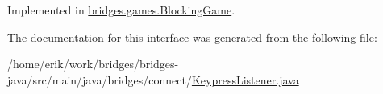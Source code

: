 Implemented in \hyperlink{classbridges_1_1games_1_1_blocking_game_a53b1b38826785ee7c7a13f486b7b72ba}{bridges.\+games.\+Blocking\+Game}.



The documentation for this interface was generated from the following file\+:\begin{DoxyCompactItemize}
\item 
/home/erik/work/bridges/bridges-\/java/src/main/java/bridges/connect/\hyperlink{_keypress_listener_8java}{Keypress\+Listener.\+java}\end{DoxyCompactItemize}
